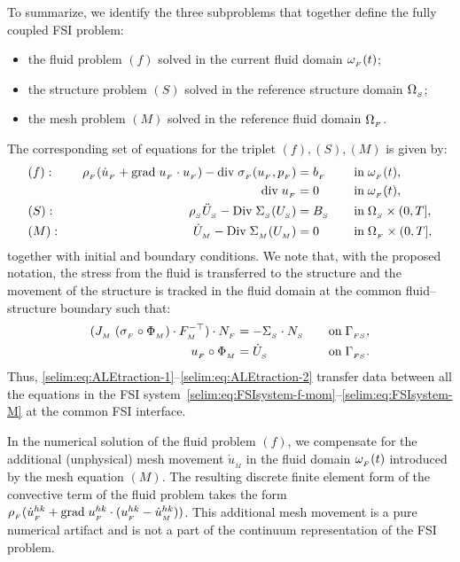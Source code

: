 To summarize, we identify the three subproblems that together define
the fully coupled FSI problem:
\begin{itemize}
  \item the fluid problem $(f)$ solved in the current fluid domain
  $\omega_{_{F}}(t)$;

  \item the structure problem $(S)$ solved in the reference structure
  domain $\Omega_{_{S}}$;

  \item the mesh problem $(M)$ solved in the reference fluid domain $\Omega_{_{F}}$.
\end{itemize}
The corresponding set of equations for the triplet
$(f),(S),(M)$ is given by:
\begin{align}
  \label{selim:eq:FSIsystem-f-mom}
  &(f):&\quad
  \rho_{_{F}}(\dot{u}_{_{F}} + \textrm{grad}\;u_{_{F}}\cdot u_{_{F}}) - \textrm{div}\;\sigma_{_{F}}(u_{_{F}},p_{_{F}}) &= b_{_{F}}
  \quad&&\textrm{in}\;\omega_{_{F}}(t),
  \\
  \label{selim:eq:FSIsystem-f-con}
  &&
  \textrm{div}\;u_{_{F}} &= 0
  \quad&&\textrm{in}\;\omega_{_{F}}(t),
  \\
  \label{selim:eq:FSIsystem-S}
  &(S):&\quad
  \rho_{_{S}} \ddot{U}_{_{S}} - \textrm{Div}\; \Sigma_{_{S}}(U_{_{S}}) &= B_{_{S}}
  \quad&&\textrm{in}\;\Omega_{_{S}}\times(0,T],
  \\
  \label{selim:eq:FSIsystem-M}
  &(M):&\quad
  \dot{U}_{_{M}} - \textrm{Div}\; \Sigma_{_{M}}(U_{_{M}}) &= 0
  \quad&&\textrm{in}\;\Omega_{_{F}}\times(0,T],
\end{align}
together with initial and boundary conditions. We note that, with the
proposed notation, the stress from the fluid is transferred to the
structure and the movement of the structure is tracked in the fluid
domain at the common fluid--structure boundary such that:
\begin{align}
  \label{selim:eq:ALEtraction-1}
  (J_{_{M}}\;(\sigma_{_{F}}\circ\Phi_{_{M}}) \cdot F_{_{M}}^{-\top})\cdot
  N_{_{F}} &= - \Sigma_{_{S}}\cdot N_{_{S}}
  \quad &&\textrm{on}\;\Gamma_{_{FS}},
  \\
  \label{selim:eq:ALEtraction-2}
  u_{_{F}}\circ\Phi_{_{M}} &= \dot{U}_{_{S}}
  \quad &&\textrm{on}\;\Gamma_{_{FS}}.
\end{align}
Thus, \eqref{selim:eq:ALEtraction-1}--\eqref{selim:eq:ALEtraction-2} transfer data between all the
equations in the FSI system~\eqref{selim:eq:FSIsystem-f-mom}--\eqref{selim:eq:FSIsystem-M} at the common FSI interface.

In the numerical solution of the fluid problem $(f)$, we compensate
for the additional (unphysical) mesh movement $\dot{u}_{_{M}}$ in the
fluid domain $\omega_{_{F}}(t)$ introduced by the mesh equation $(M)$.  The
resulting discrete finite element form of the convective term of the
fluid problem takes the form $\rho_{_{F}}(\dot{u}_{_{F}}^{hk} +
\textrm{grad}\;u_{_{F}}^{hk}\cdot(u_{_{F}}^{hk} - \dot{u}_{_{M}}^{hk}))$. This additional mesh
movement is a pure numerical artifact and is not a part of the
continuum representation of the FSI problem.

